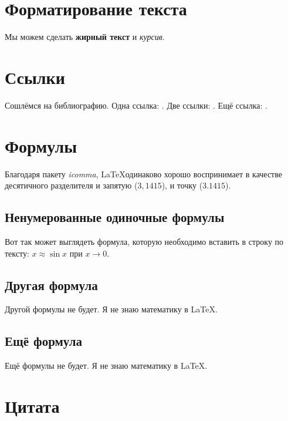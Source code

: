 \section{Форматирование текста}\label{sec:chapter_1/section_1}

Мы можем сделать \textbf{жирный текст} и \textit{курсив}.

\section{Ссылки}\label{sec:chapter_1/section_2}

Сошлёмся на библиографию.
Одна ссылка: \cite{kuznetsov}.
Две ссылки: \cite{kuznetsov, creating_a_ros_package}.
Ещё ссылка: \cite{gost_9294_93}.

\section{Формулы}\label{sec:chapter_1/section_3}

Благодаря пакету \textit{icomma}, \LaTeX одинаково хорошо воспринимает в качестве десятичного разделителя и запятую (\(3,1415\)), и точку (\(3.1415\)).

\subsection{Ненумерованные одиночные формулы}\label{subsec:chapter_1/section_3/subsection_1}

Вот так может выглядеть формула, которую необходимо вставить в строку по тексту: \(x \approx \sin x\) при \(x \to 0\).

\subsection{Другая формула}\label{subsec:chapter_1/section_3/subsection_2}

Другой формулы не будет. Я не знаю математику в \LaTeX.

\subsection{Ещё формула}\label{subsec:chapter_1/section_3/subsection_3}

Ещё формулы не будет. Я не знаю математику в \LaTeX.

\section{Цитата}\label{sec:chapter_1/section_4}

